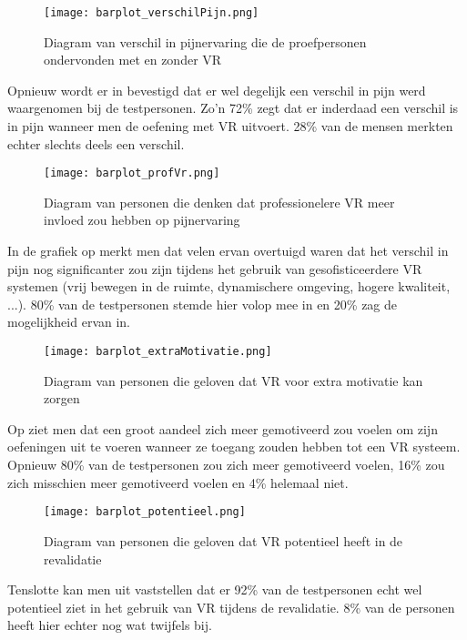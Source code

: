 \begin{figure}[h]
    \centering
    \texttt{[image: barplot\_verschilPijn.png]}
    \caption{Diagram van verschil in pijnervaring die de proefpersonen ondervonden met en zonder VR}
    \label{figuur 6.7}
\end{figure}

\newpage

Opnieuw wordt er in \cite{figuur 6.7} bevestigd dat er wel degelijk een verschil in pijn werd waargenomen bij de testpersonen. Zo'n 72\% zegt dat er inderdaad een verschil is in pijn wanneer men de oefening met VR uitvoert. 28\% van de mensen merkten echter slechts deels een verschil.

\begin{figure}[h]
    \centering
    \texttt{[image: barplot\_profVr.png]}
    \caption{Diagram van personen die denken dat professionelere VR meer invloed zou hebben op pijnervaring}
    \label{figuur 6.8}
\end{figure}

In de grafiek op \cite{figuur 6.8} merkt men dat velen ervan overtuigd waren dat het verschil in pijn nog significanter zou zijn tijdens het gebruik van gesofisticeerdere VR systemen (vrij bewegen in de ruimte, dynamischere omgeving, hogere kwaliteit, ...). 80\% van de testpersonen stemde hier volop mee in en 20\% zag de mogelijkheid ervan in.

\begin{figure}[h]
    \centering
    \texttt{[image: barplot\_extraMotivatie.png]}
    \caption{Diagram van personen die geloven dat VR voor extra motivatie kan zorgen}
    \label{figuur 6.9}
\end{figure}

Op \cite{figuur 6.9} ziet men dat een groot aandeel zich meer gemotiveerd zou voelen om zijn oefeningen uit te voeren wanneer ze toegang zouden hebben tot een VR systeem. Opnieuw 80\% van de testpersonen zou zich meer gemotiveerd voelen, 16\% zou zich misschien meer gemotiveerd voelen en 4\% helemaal niet.

\begin{figure}[h]
    \centering
    \texttt{[image: barplot\_potentieel.png]}
    \caption{Diagram van personen die geloven dat VR potentieel heeft in de revalidatie}
    \label{figuur 6.10}
\end{figure}

Tenslotte kan men uit \cite{figuur 6.10} vaststellen dat er 92\% van de testpersonen echt wel potentieel ziet in het gebruik van VR tijdens de revalidatie. 8\% van de personen heeft hier echter nog wat twijfels bij.




